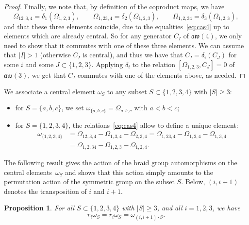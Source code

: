 \documentclass[pdftex]{sigma}
\numberwithin{equation}{section}
\newtheorem{prop}[theo]{Proposition}
\theoremstyle{definition}
\newcommand{\rb}{\overline{r}}
\begin{document}
\begin{proof}
Finally, we note that, by definition of the coproduct maps, we have
\[\varOmega_{12,3,4}=\delta_1(\varOmega_{1,2,3}) ,\qquad \varOmega_{1,23,4}=\delta_2(\varOmega_{1,2,3}) ,\qquad\varOmega_{1,2,34}=\delta_3(\varOmega_{1,2,3}) ,\]
and that these three elements coincide, due to the equalities~\eqref{eq:cas4} up to elements which are already central. So for any generator $C_I$ of $\mathfrak{aw}(4)$, we only need to show that it commutes with one of these three elements. We can assume that $|I|>1$ (otherwise $C_I$ is central), and thus we have that $C_I=\delta_i(C_J)$ for some $i$ and some $J\subset\{1,2,3\}$. Applying $\delta_i$ to the relation $[\varOmega_{1,2,3},C_J]=0$ of $\mathfrak{aw}(3)$, we get that $C_I$ commutes with one of the elements above, as needed.
\end{proof}

We associate a central element $\omega_S$ to any subset $S\subset\{1,2,3,4\}$ with $|S|\geq3$:
\begin{itemize}\itemsep=0pt
\item for $S=\{a,b,c\}$, we set $\omega_{\{a,b,c\}}=\varOmega_{a,b,c}$ with $a<b<c$;
\item for $S=\{1,2,3,4\}$,
the relations~\eqref{eq:cas4} allow to define a unique element:
\begin{align*}
\omega_{\{1,2,3,4\}}&{}=\varOmega_{12,3,4}-\varOmega_{1,3,4}-\varOmega_{2,3,4}=\varOmega_{1,23,4}-\varOmega_{1,2,4}-\varOmega_{1,3,4}\\
&{}=\varOmega_{1,2,34}-\varOmega_{1,2,3}-\varOmega_{1,2,4} .
\end{align*}
\end{itemize}
The following result gives the action of the braid group automorphisms on the central elements~$\omega_S$ and shows that this action simply amounts to the permutation action of the symmetric group on the subset $S$. Below, $(i,i+1)$ denotes the transposition of $i$ and $i+1$.
\begin{prop}
For all $S\subset \{1,2,3,4\}$ with $|S|\geq 3$, and all $i=1,2,3$, we have
\[r_i\omega_S=\rb_i\omega_S=\omega_{(i,i+1)\cdot S} .\]
\end{prop}
\end{document}

